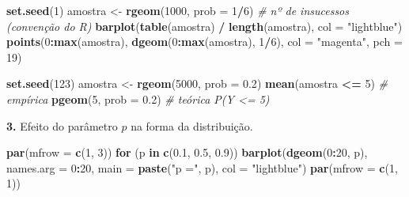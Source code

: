 \documentclass[
  portuguese,
  11pt,
  openany]{book}
\newenvironment{Shaded}{\begin{snugshade}}{\end{snugshade}}
\newcommand{\AttributeTok}[1]{\textcolor[rgb]{0.13,0.29,0.53}{#1}}
\newcommand{\CommentTok}[1]{\textcolor[rgb]{0.56,0.35,0.01}{\textit{#1}}}
\newcommand{\ControlFlowTok}[1]{\textcolor[rgb]{0.13,0.29,0.53}{\textbf{#1}}}
\newcommand{\DecValTok}[1]{\textcolor[rgb]{0.00,0.00,0.81}{#1}}
\newcommand{\FloatTok}[1]{\textcolor[rgb]{0.00,0.00,0.81}{#1}}
\newcommand{\FunctionTok}[1]{\textcolor[rgb]{0.13,0.29,0.53}{\textbf{#1}}}
\newcommand{\NormalTok}[1]{#1}
\newcommand{\OtherTok}[1]{\textcolor[rgb]{0.56,0.35,0.01}{#1}}
\newcommand{\SpecialCharTok}[1]{\textcolor[rgb]{0.81,0.36,0.00}{\textbf{#1}}}
\newcommand{\StringTok}[1]{\textcolor[rgb]{0.31,0.60,0.02}{#1}}
\begin{document}
\begin{Shaded}
\begin{Highlighting}[]
\FunctionTok{set.seed}\NormalTok{(}\DecValTok{1}\NormalTok{)}
\NormalTok{amostra }\OtherTok{\textless{}{-}} \FunctionTok{rgeom}\NormalTok{(}\DecValTok{1000}\NormalTok{, }\AttributeTok{prob =} \DecValTok{1}\SpecialCharTok{/}\DecValTok{6}\NormalTok{)          }\CommentTok{\# nº de insucessos (convenção do R)}
\FunctionTok{barplot}\NormalTok{(}\FunctionTok{table}\NormalTok{(amostra) }\SpecialCharTok{/} \FunctionTok{length}\NormalTok{(amostra), }\AttributeTok{col =} \StringTok{"lightblue"}\NormalTok{)}
\FunctionTok{points}\NormalTok{(}\DecValTok{0}\SpecialCharTok{:}\FunctionTok{max}\NormalTok{(amostra), }\FunctionTok{dgeom}\NormalTok{(}\DecValTok{0}\SpecialCharTok{:}\FunctionTok{max}\NormalTok{(amostra), }\DecValTok{1}\SpecialCharTok{/}\DecValTok{6}\NormalTok{), }\AttributeTok{col =} \StringTok{"magenta"}\NormalTok{, }\AttributeTok{pch =} \DecValTok{19}\NormalTok{)}

\FunctionTok{set.seed}\NormalTok{(}\DecValTok{123}\NormalTok{)}
\NormalTok{amostra }\OtherTok{\textless{}{-}} \FunctionTok{rgeom}\NormalTok{(}\DecValTok{5000}\NormalTok{, }\AttributeTok{prob =} \FloatTok{0.2}\NormalTok{)}
\FunctionTok{mean}\NormalTok{(amostra }\SpecialCharTok{\textless{}=} \DecValTok{5}\NormalTok{)          }\CommentTok{\# empírica}
\FunctionTok{pgeom}\NormalTok{(}\DecValTok{5}\NormalTok{, }\AttributeTok{prob =} \FloatTok{0.2}\NormalTok{)        }\CommentTok{\# teórica P(Y \textless{}= 5)}
\end{Highlighting}
\end{Shaded}

\textbf{3.} Efeito do parâmetro \(p\) na forma da distribuição.

\begin{Shaded}
\begin{Highlighting}[]
\FunctionTok{par}\NormalTok{(}\AttributeTok{mfrow =} \FunctionTok{c}\NormalTok{(}\DecValTok{1}\NormalTok{, }\DecValTok{3}\NormalTok{))}
\ControlFlowTok{for}\NormalTok{ (p }\ControlFlowTok{in} \FunctionTok{c}\NormalTok{(}\FloatTok{0.1}\NormalTok{, }\FloatTok{0.5}\NormalTok{, }\FloatTok{0.9}\NormalTok{))}
  \FunctionTok{barplot}\NormalTok{(}\FunctionTok{dgeom}\NormalTok{(}\DecValTok{0}\SpecialCharTok{:}\DecValTok{20}\NormalTok{, p), }\AttributeTok{names.arg =} \DecValTok{0}\SpecialCharTok{:}\DecValTok{20}\NormalTok{,}
          \AttributeTok{main =} \FunctionTok{paste}\NormalTok{(}\StringTok{"p ="}\NormalTok{, p), }\AttributeTok{col =} \StringTok{"lightblue"}\NormalTok{)}
\FunctionTok{par}\NormalTok{(}\AttributeTok{mfrow =} \FunctionTok{c}\NormalTok{(}\DecValTok{1}\NormalTok{, }\DecValTok{1}\NormalTok{))}
\end{Highlighting}
\end{Shaded}
\end{document}
